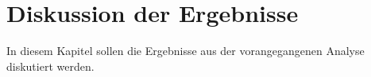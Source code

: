 \chapter{Diskussion der Ergebnisse}
In diesem Kapitel sollen die Ergebnisse aus der vorangegangenen Analyse diskutiert werden.